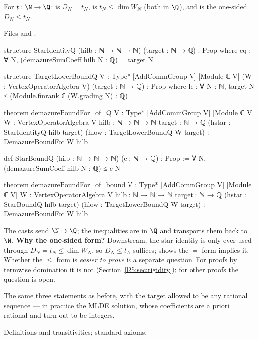 \begin{definition}\label{l25:def:Qinputs}
For $t:\N\to\Q$:  is $D_N=t_N$,  is $t_N\le\dim W_N$
(both in $\Q$), and  is the one-sided $D_N\le t_N$.
\end{definition}
\noindent Files  and
.
\begin{leancode}
structure StarIdentityQ (hilb : ℕ → ℕ → ℕ) (target : ℕ → ℚ) : Prop where
  eq : ∀ N, (demazureSumCoeff hilb N : ℚ) = target N

structure TargetLowerBoundQ {V : Type*} [AddCommGroup V] [Module ℂ V]
    (W : VertexOperatorAlgebra V) (target : ℕ → ℚ) : Prop where
  le : ∀ N : ℕ, target N ≤ (Module.finrank ℂ (W.grading N) : ℚ)

theorem demazureBoundFor_of_Q {V : Type*} [AddCommGroup V] [Module ℂ V]
    {W : VertexOperatorAlgebra V} {hilb : ℕ → ℕ → ℕ} {target : ℕ → ℚ}
    (hstar : StarIdentityQ hilb target) (hlow : TargetLowerBoundQ W target) :
    DemazureBoundFor W hilb
\end{leancode}
\begin{leancode}
def StarBoundQ (hilb : ℕ → ℕ → ℕ) (c : ℕ → ℚ) : Prop :=
  ∀ N, (demazureSumCoeff hilb N : ℚ) ≤ c N

theorem demazureBoundFor_of_bound {V : Type*} [AddCommGroup V] [Module ℂ V]
    {W : VertexOperatorAlgebra V} {hilb : ℕ → ℕ → ℕ} {target : ℕ → ℚ}
    (hstar : StarBoundQ hilb target) (hlow : TargetLowerBoundQ W target) :
    DemazureBoundFor W hilb
\end{leancode}
\begin{dictionary}
The casts  send $\N\to\Q$; the inequalities are in $\Q$ and  transports them
back to $\N$. \textbf{Why the one-sided form?} Downstream, the star identity is only ever used through
$D_N=t_N\le\dim W_N$, so $D_N\le t_N$ suffices;  shows the $=$ form implies
it. Whether the $\le$ form is \emph{easier to prove} is a separate question. For proofs by termwise domination it
is not (Section~\ref{l25:sec:rigidity}); for other proofs the question is open.
\end{dictionary}
\begin{physics}
The same three statements as before, with the target allowed to be any rational sequence --- in practice the
MLDE solution, whose coefficients are a priori rational and turn out to be integers.
\end{physics}
\begin{status}
Definitions and transitivities; standard axioms.
\end{status}

